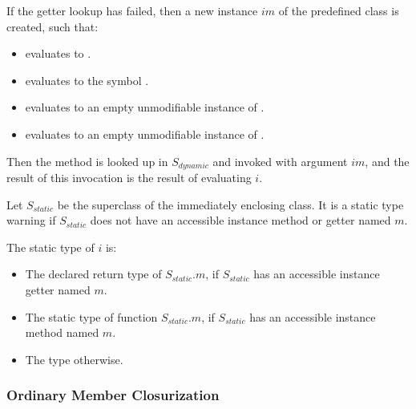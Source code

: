 \documentclass{article}
\begin{document}
\LMHash{}
If the getter lookup has failed, then a new instance $im$ of the predefined class  is created, such that:
\begin{itemize}
\item {} evaluates to \code{\TRUE{}}.
\item {} evaluates to the symbol .
\item {} evaluates to an empty unmodifiable instance of .
\item {} evaluates to an empty unmodifiable instance of .
\end{itemize}
Then the method  is looked up in $S_{dynamic}$ and invoked with argument $im$, and the result of this invocation is the result of evaluating $i$.

\LMHash{}
Let $S_{static}$ be the superclass of the immediately enclosing class.
It is a static type warning if $S_{static}$ does not have an accessible instance method or getter named $m$.

The static type of $i$ is:
\begin{itemize}
\item The declared return type of $S_{static}.m$, if $S_{static}$ has an accessible instance getter named $m$.
\item The static type of function $S_{static}.m$, if $S_{static}$ has an accessible instance method named $m$.
\item The type \DYNAMIC{} otherwise.
\end{itemize}


\subsubsection{Ordinary Member Closurization}
\end{document}
